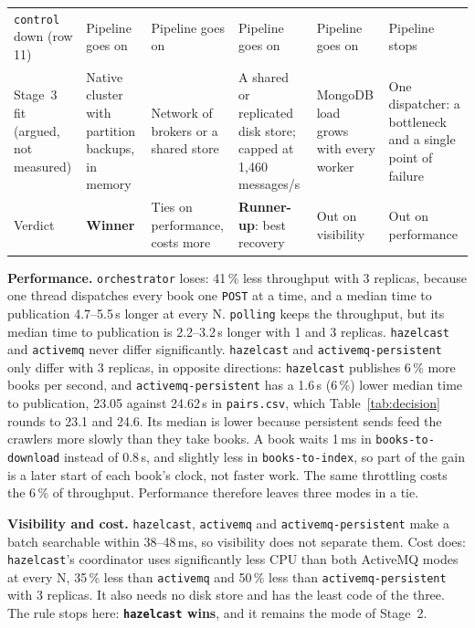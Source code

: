 \documentclass[11pt,a4paper]{article}
\newcommand{\code}[1]{\nolinkurl{#1}}
\newcommand{\mode}[1]{\code{#1}}
\begin{document}
\begin{table}[ht]
\begin{tabularx}{\textwidth}{@{}L{2.45cm}YYYYY@{}}
\code{control} down (row 11) & Pipeline goes on & Pipeline goes on & Pipeline goes on & Pipeline goes on & Pipeline stops \\
\addlinespace
Stage~3 fit (argued, not measured) & Native cluster with partition backups, in memory & Network of brokers or a shared store & A shared or replicated disk store; capped at 1{,}460 messages/s & MongoDB load grows with every worker & One dispatcher: a bottleneck and a single point of failure \\
\midrule
Verdict & \textbf{Winner} & Ties on performance, costs more & \textbf{Runner-up}: best recovery & Out on visibility & Out on performance \\
\bottomrule
\end{tabularx}
\end{table}

\textbf{Performance.} \mode{orchestrator} loses: 41\,\% less throughput with 3 replicas, because one thread dispatches
every book one \code{POST} at a time, and a median time to publication 4.7--5.5\,s longer at every N. \mode{polling}
keeps the throughput, but its median time to publication is 2.2--3.2\,s longer with 1 and 3 replicas.
\mode{hazelcast} and \mode{activemq} never differ significantly. \mode{hazelcast} and \mode{activemq-persistent} only
differ with 3 replicas, in opposite directions: \mode{hazelcast} publishes 6\,\% more books per second, and
\mode{activemq-persistent} has a 1.6\,s (6\,\%) lower median time to publication, 23.05 against 24.62\,s in
\code{pairs.csv}, which Table~\ref{tab:decision} rounds to 23.1 and 24.6. Its median is lower because persistent sends
feed the crawlers more slowly than they take books. A book waits 1\,ms in \code{books-to-download} instead of 0.8\,s, and slightly less in
\code{books-to-index}, so part of the gain is a later start of each book's clock, not faster work. The same throttling
costs the 6\,\% of throughput. Performance therefore leaves three modes in a tie.

\textbf{Visibility and cost.} \mode{hazelcast}, \mode{activemq} and \mode{activemq-persistent} make a batch searchable
within 38--48\,ms, so visibility does not separate them. Cost does: \mode{hazelcast}'s coordinator uses significantly
less CPU than both ActiveMQ modes at every N, 35\,\% less than \mode{activemq} and 50\,\% less than
\mode{activemq-persistent} with 3 replicas. It also needs no disk store and has the least code of the three. The rule
stops here: \textbf{\mode{hazelcast} wins}, and it remains the mode of Stage~2.
\end{document}
